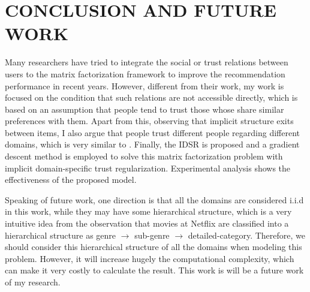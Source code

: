 \section{CONCLUSION AND FUTURE WORK}
Many researchers have tried to integrate the social or trust relations between users to the matrix factorization framework to improve the recommendation performance in recent years. However, different from their work, my work is focused on the condition that such relations are not accessible directly, which is based on an assumption that people tend to trust those whose share similar preferences with them. Apart from this, observing that implicit structure exits between items, I also argue that people trust different people regarding different domains, which is very similar to \cite{yang2012circle}. Finally, the IDSR is proposed and a gradient descent method is employed to solve this matrix factorization problem with implicit domain-specific trust regularization. Experimental analysis shows the effectiveness of the proposed model.

Speaking of future work, one direction is that all the domains are considered i.i.d in this work, while they may have some hierarchical structure, which is a very intuitive idea from the observation that movies at Netflix are classified into a hierarchical structure as genre $\rightarrow$ sub-genre $\rightarrow$ detailed-category. Therefore, we should consider this hierarchical structure of all the domains when modeling this problem. However, it will increase hugely the computational complexity, which can make it very costly to calculate the result. This work is will be a future work of my research.